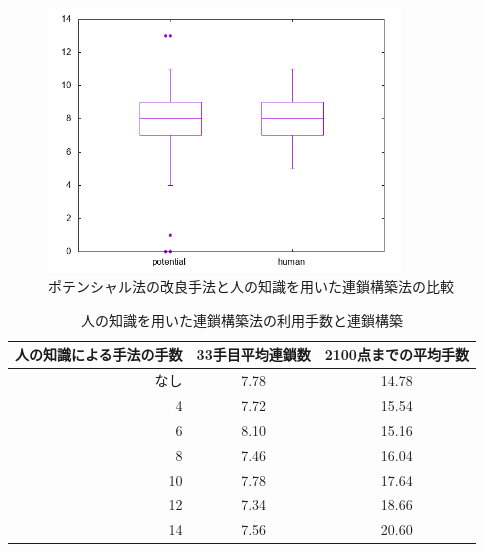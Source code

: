 \documentclass[12pt]{jarticle}
\begin{document}
\begin{figure}[hbt]
  \begin{center}
  \includegraphics[height=7cm]{experiment/HumanKnowledge/chain_poten_human.png}
  \caption{ポテンシャル法の改良手法と人の知識を用いた連鎖構築法の比較} \label{fig:chain_poten_human}
\end{center}
\end{figure}


\begin{table}[htb]
\begin{center}
\caption{人の知識を用いた連鎖構築法の利用手数と連鎖構築} \label{tab:human}
  \begin{tabular}{|r|c|c|} \hline
人の知識による手法の手数 & 33手目平均連鎖数 & 2100点までの平均手数\\ \hline
なし& 7.78 & 14.78\\ \hline
 4 & 7.72 & 15.54\\ \hline
 6 & 8.10 & 15.16\\ \hline
 8 & 7.46 & 16.04\\ \hline
10 & 7.78 & 17.64\\ \hline
12 & 7.34 & 18.66\\ \hline
14 & 7.56 & 20.60\\ \hline
\end{tabular}
\end{center}
\end{table}
\end{document}
